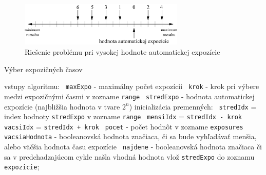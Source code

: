 \begin{figure}[h!]
    \centering
    \includegraphics[width=0.7\textwidth]{figures/capturing/expoSelector1}
    \caption{Riešenie problému pri vysokej hodnote automatickej expozície}
    \label{fig:expoSelector1}
\end{figure}

\begin{algorithm}[]
    \SetAlgoLined
    \DontPrintSemicolon
    \caption{Výber expozičných časov}
    \label{algo_expositions}

    vstupy algoritmu:\;
    \texttt{  maxExpo} - maximálny počet expozícii\;
    \texttt{  krok} - krok pri výbere medzi expozičnými časmi v zozname \texttt{range}\;
    \texttt{  stredExpo} - hodnota automatickej expozície (najbližšia hodnota v tvare $2^{n}$)\;
    \;
    inicializácia premenných:\;
    \texttt{  stredIdx} = index hodnoty \texttt{stredExpo} v zozname \texttt{range}\;
    \texttt{  mensiIdx} = \texttt{stredIdx - krok}\;
    \texttt{  vacsiIdx} = \texttt{stredIdx + krok}\;
    \texttt{  pocet} - počet hodnôt v zozname \texttt{exposures}\;
    \texttt{  vacsiaHodnota} - booleanovská hodnota značiaca, či sa bude vyhľadávať menšia,
    alebo väčšia hodnota času expozície\;
    \texttt{  najdene} - booleanovská hodnota značiaca či sa v predchadzajúcom cykle našla vhodná hodnota\;
    \;
    vlož \texttt{stredExpo} do zoznamu \texttt{expozicie};\;
    \;
\end{algorithm}

